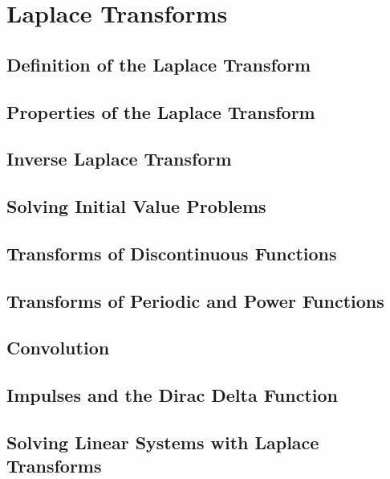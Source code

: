 \documentclass[../diffeq.tex]{subfiles}
\begin{document}
\chapter{Laplace Transforms}
\section{Definition of the Laplace Transform}
\section{Properties of the Laplace Transform}
\section{Inverse Laplace Transform}
\section{Solving Initial Value Problems}
\section{Transforms of Discontinuous Functions}
\section{Transforms of Periodic and Power Functions}
\section{Convolution}
\section{Impulses and the Dirac Delta Function}
\section{Solving Linear Systems with Laplace Transforms}
\end{document}
